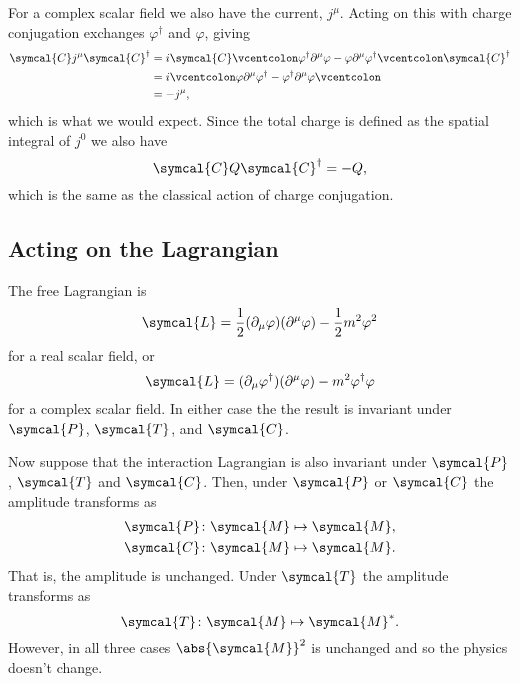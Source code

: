 \documentclass[fleqn]{NotesClass}
\newcommand{\lagrangianDensity}{\symcal{L}}
\newcommand{\parity}{\symcal{P}}
\newcommand{\chargeConjugation}{\symcal{C}}
\newcommand{\timeReversal}{\symcal{T}}
\newcommand{\hermit}{{\dagger}}
\newcommand{\normalordering}[1]{\mathopen{\vcentcolon}{#1}\mathclose{\vcentcolon}}
\newcommand{\amplitude}{\symcal{M}}
\begin{document}
    For a complex scalar field we also have the current, \(j^\mu\).
    Acting on this with charge conjugation exchanges \(\varphi^\hermit\) and \(\varphi\), giving
    \begin{align}
        \chargeConjugation j^\mu \chargeConjugation^\hermit &= i \chargeConjugation \normalordering{\varphi^\hermit \partial^\mu \varphi - \varphi \partial^\mu \varphi^\hermit} \chargeConjugation^\hermit\\
        &= i\normalordering{\varphi\partial^\mu \varphi^\hermit - \varphi^\hermit \partial^\mu \varphi}\\
        &= -j^\mu,
    \end{align}
    which is what we would expect.
    Since the total charge is defined as the spatial integral of \(j^0\) we also have
    \begin{equation}
        \chargeConjugation Q \chargeConjugation^\hermit = -Q,
    \end{equation}
    which is the same as the classical action of charge conjugation.
    
    \subsection{Acting on the Lagrangian}
    The free Lagrangian is
    \begin{equation}
        \lagrangianDensity = \frac{1}{2}(\partial_\mu \varphi)(\partial^\mu \varphi) - \frac{1}{2}m^2\varphi^2
    \end{equation}
    for a real scalar field, or
    \begin{equation}
        \lagrangianDensity = (\partial_\mu \varphi^\hermit)(\partial^\mu \varphi) - m^2\varphi^\hermit \varphi
    \end{equation}
    for a complex scalar field.
    In either case the the result is invariant under \(\parity\), \(\timeReversal\), and \(\chargeConjugation\).
    
    Now suppose that the interaction Lagrangian is also invariant under \(\parity\), \(\timeReversal\) and \(\chargeConjugation\).
    Then, under \(\parity\) or \(\chargeConjugation\) the amplitude transforms as
    \begin{align}
        \parity \colon \amplitude &\mapsto \amplitude,\\
        \chargeConjugation \colon \amplitude &\mapsto \amplitude.
    \end{align}
    That is, the amplitude is unchanged.
    Under \(\timeReversal\) the amplitude transforms as
    \begin{equation}
        \timeReversal \colon \amplitude \mapsto \amplitude^*.
    \end{equation}
    However, in all three cases \(\abs{\amplitude}^2\) is unchanged and so the physics doesn't change.
    
\end{document}

